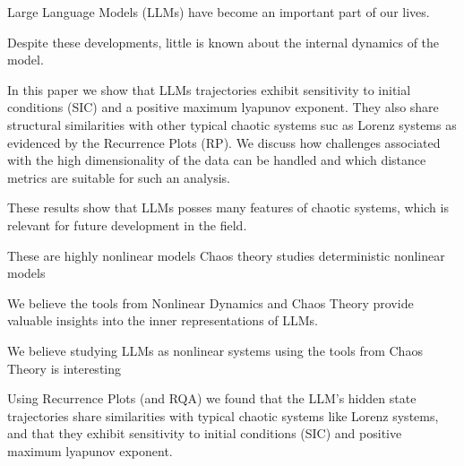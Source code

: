 

Large Language Models (LLMs) have become an important part of our lives.

Despite these developments, little is known about the internal dynamics of the model.



In this paper we show that LLMs trajectories exhibit sensitivity to initial conditions (SIC) and a positive maximum lyapunov exponent. They also share structural similarities with other typical chaotic systems suc as Lorenz systems as evidenced by the Recurrence Plots (RP). We discuss how challenges associated with the high dimensionality of the data can be handled and which distance metrics are suitable for such an analysis.

These results show that LLMs posses many features of chaotic systems, which is relevant for future development in the field.



These are highly nonlinear models
Chaos theory studies deterministic nonlinear models

We believe the tools from Nonlinear Dynamics and Chaos Theory provide valuable insights into the inner representations of LLMs.

We believe studying LLMs as nonlinear systems using the tools from Chaos Theory is interesting





Using Recurrence Plots (and RQA) we found that the LLM's hidden state trajectories share similarities with typical chaotic systems like Lorenz systems, and that they exhibit sensitivity to initial conditions (SIC) and positive maximum lyapunov exponent.












